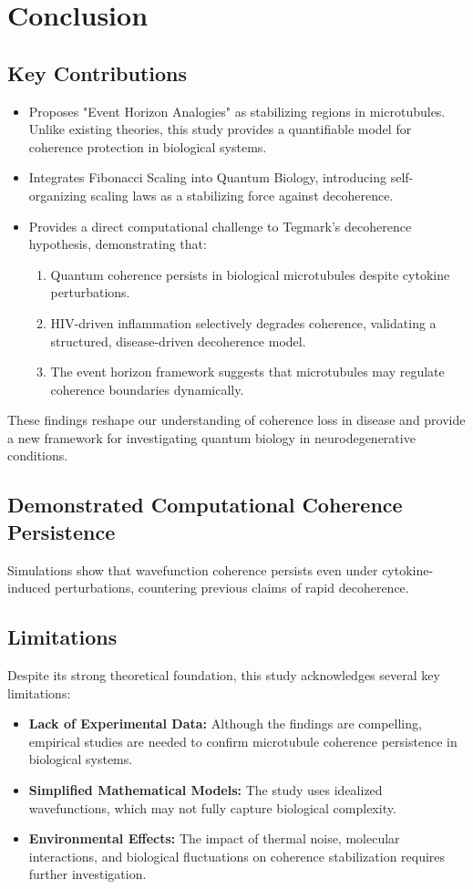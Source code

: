\section{Conclusion}
\subsection{Key Contributions}
\begin{itemize}
\item Proposes "Event Horizon Analogies" as stabilizing regions in microtubules. Unlike existing theories, this study provides a quantifiable model for coherence protection in biological systems.
 \item Integrates Fibonacci Scaling into Quantum Biology, introducing self-organizing scaling laws as a stabilizing force against decoherence.
\item Provides a direct computational challenge to Tegmark's decoherence hypothesis, demonstrating that:
\begin{enumerate}
\item Quantum coherence persists in biological microtubules despite cytokine perturbations.
\item HIV-driven inflammation selectively degrades coherence, validating a structured, disease-driven decoherence model.
\item The event horizon framework suggests that microtubules may regulate coherence boundaries dynamically.
\end{enumerate}
\end{itemize}

These findings reshape our understanding of coherence loss in disease and provide a new framework for investigating quantum biology in neurodegenerative conditions.

\subsection{Demonstrated Computational Coherence Persistence} 
Simulations show that wavefunction coherence persists even under cytokine-induced perturbations, countering previous claims of rapid decoherence.

\subsection{Limitations}
Despite its strong theoretical foundation, this study acknowledges several key limitations:
\begin{itemize}
    \item \textbf{Lack of Experimental Data:} Although the findings are compelling, empirical studies are needed to confirm microtubule coherence persistence in biological systems.
    \item \textbf{Simplified Mathematical Models:} The study uses idealized wavefunctions, which may not fully capture biological complexity.
    \item \textbf{Environmental Effects:} The impact of thermal noise, molecular interactions, and biological fluctuations on coherence stabilization requires further investigation.
\end{itemize}

